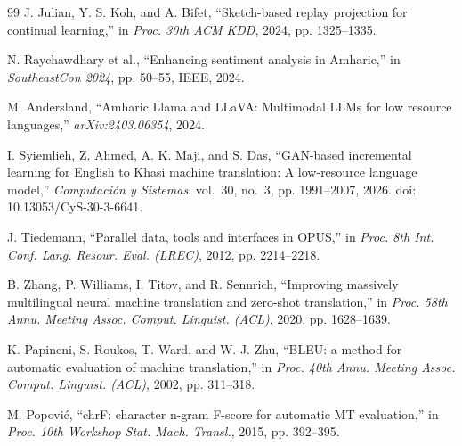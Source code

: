 \documentclass[11pt,a4paper]{article}
\begin{document}
\begin{thebibliography}{99}
J. Julian, Y. S. Koh, and A. Bifet, ``Sketch-based replay projection
for continual learning,'' in \emph{Proc. 30th ACM KDD}, 2024,
pp. 1325--1335.

N. Raychawdhary et al., ``Enhancing sentiment analysis in Amharic,''
in \emph{SoutheastCon 2024}, pp. 50--55, IEEE, 2024.

M. Andersland, ``Amharic Llama and LLaVA: Multimodal LLMs for low
resource languages,'' \emph{arXiv:2403.06354}, 2024.

I. Syiemlieh, Z. Ahmed, A. K. Maji, and S. Das, ``GAN-based
incremental learning for English to Khasi machine translation:
A low-resource language model,'' \emph{Computaci\'on y Sistemas},
vol.~30, no.~3, pp. 1991--2007, 2026.
doi: 10.13053/CyS-30-3-6641.

J. Tiedemann, ``Parallel data, tools and interfaces in OPUS,'' in
\emph{Proc. 8th Int. Conf. Lang. Resour. Eval. (LREC)}, 2012,
pp. 2214--2218.

B. Zhang, P. Williams, I. Titov, and R. Sennrich, ``Improving massively
multilingual neural machine translation and zero-shot translation,'' in
\emph{Proc. 58th Annu. Meeting Assoc. Comput. Linguist. (ACL)}, 2020,
pp. 1628--1639.

K. Papineni, S. Roukos, T. Ward, and W.-J. Zhu, ``BLEU: a method for
automatic evaluation of machine translation,'' in \emph{Proc. 40th Annu.
Meeting Assoc. Comput. Linguist. (ACL)}, 2002, pp. 311--318.

M. Popovi{\'c}, ``chrF: character n-gram F-score for automatic MT
evaluation,'' in \emph{Proc. 10th Workshop Stat. Mach. Transl.}, 2015,
pp. 392--395.

\end{thebibliography}
\end{document}
